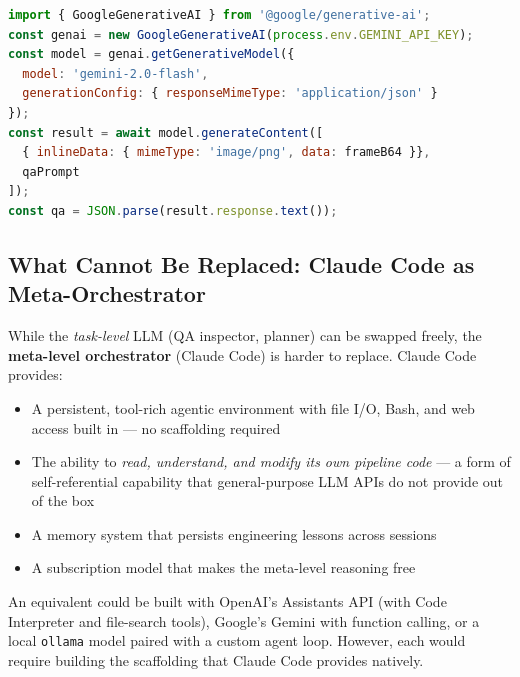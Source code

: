\documentclass[12pt,a4paper]{article}
\begin{document}
\begin{lstlisting}[language=JavaScript,caption=QA inspector with Gemini Flash]
import { GoogleGenerativeAI } from '@google/generative-ai';
const genai = new GoogleGenerativeAI(process.env.GEMINI_API_KEY);
const model = genai.getGenerativeModel({
  model: 'gemini-2.0-flash',
  generationConfig: { responseMimeType: 'application/json' }
});
const result = await model.generateContent([
  { inlineData: { mimeType: 'image/png', data: frameB64 }},
  qaPrompt
]);
const qa = JSON.parse(result.response.text());
\end{lstlisting}

\subsection{What Cannot Be Replaced: Claude Code as Meta-Orchestrator}

While the \emph{task-level} LLM (QA inspector, planner) can be swapped freely,
the \textbf{meta-level orchestrator} (Claude Code) is harder to replace. Claude
Code provides:

\begin{itemize}[leftmargin=2em]
  \item A persistent, tool-rich agentic environment with file I/O, Bash, and
        web access built in --- no scaffolding required
  \item The ability to \emph{read, understand, and modify its own pipeline code}
        --- a form of self-referential capability that general-purpose LLM APIs
        do not provide out of the box
  \item A memory system that persists engineering lessons across sessions
  \item A subscription model that makes the meta-level reasoning free
\end{itemize}

An equivalent could be built with OpenAI's Assistants API (with Code Interpreter
and file-search tools), Google's Gemini with function calling, or a local
\texttt{ollama} model paired with a custom agent loop. However, each would
require building the scaffolding that Claude Code provides natively.
\end{document}
